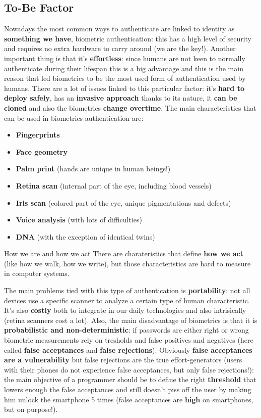 \subsection{To-Be Factor}
Nowadays the most common ways to authenticate are linked to identity as 
\textbf{something we have}, biometric authentication: this has a high level of
security and requires no extra hardware to carry around (we are the key!). 
Another important thing is that it's \textbf{effortless}: since humans are not
keen to normally authenticate during their lifespan this is a big advantage 
and this is the main reason that led biometrics to be the most used form of 
authentication used by humans. \newline  
There are a lot of issues linked to this particular factor: it's \textbf{hard
to deploy safely}, has an \textbf{invasive approach} thanks to its nature, it
\textbf{can be cloned} and also the biometrics \textbf{change overtime}. The 
main characteristics that can be used in biometrics authentication are:
\begin{itemize}
    \item \textbf{Fingerprints}
    \item \textbf{Face geometry}
    \item \textbf{Palm print} (hands are unique in human beings!)
    \item \textbf{Retina scan} (internal part of the eye, including 
    blood vessels)
    \item \textbf{Iris scan} (colored part of the eye, unique pigmentations 
    and defects)
    \item \textbf{Voice analysis} (with lots of difficulties)
    \item \textbf{DNA} (with the exception of identical twins)
\end{itemize}
\begin{notice}{How we are and how we act}
    There are charateristics that define \textbf{how we act} (like how we 
    walk, how we write), but those characteristics are hard to measure in
    computer systems.
\end{notice}

The main problems tied with this type of authentication is 
\textbf{portability}: not all devices use a specific scanner to analyze
a certain type of human characteristic. It's also \textbf{costly} both 
to integrate in our daily technologies and also intrisically (retina scanners
cost a lot). Also, the main disadvantage of biometrics is that it is
\textbf{probabilistic and non-deterministic}: if passwords are either right
or wrong biometric measurements rely on tresholds and false positives and 
negatives (here called \textbf{false acceptances} and \textbf{false 
rejections}). Obviously \textbf{false acceptances are a vulnerability} but 
false rejections are the true effort-generators (users with their phones do 
not experience false acceptances, but only false rejections!): the main 
objective of a programmer should be to define the right \textbf{threshold}
that lowers enough the false acceptances and still doesn't piss off the user 
by making him unlock the smartphone 5 times (false acceptances are 
\textbf{high} on smartphones, but on purpose!).

